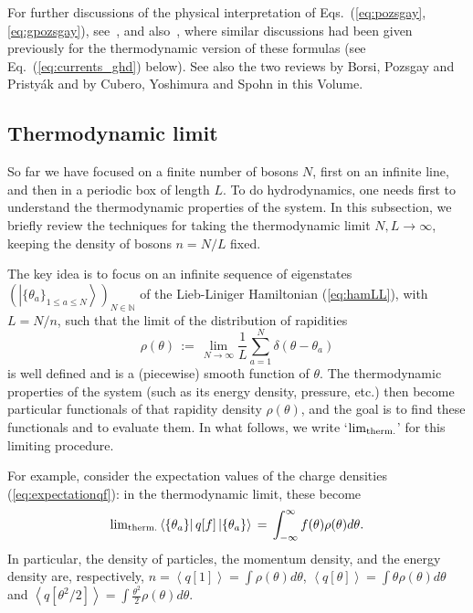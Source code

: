 \documentclass[onecolumn,amsfonts,showpacs,superscriptaddress]{revtex4-1}
\begin{document}
For further discussions of the physical interpretation of Eqs.~(\ref{eq:pozsgay},\ref{eq:gpozsgay}), see~\citep{borsi2020current}, and also~\citep{bonnes2014light,bertini2016transport,castro2016emergent,doyon2018soliton,doyon2019lecture}, where similar discussions had been given previously for the thermodynamic version of these formulas (see Eq.~(\ref{eq:currents_ghd}) below). See also the two reviews by Borsi, Pozsgay and Pristy\'ak and by Cubero, Yoshimura and Spohn in this Volume.




\subsection{Thermodynamic limit}
\label{subsec:thermodynamic_limit}

So far we have focused on a finite number of bosons $N$, first on an infinite line, and then in a periodic box of length $L$. To do hydrodynamics, one needs first to understand the thermodynamic properties of the system. In this subsection, we briefly review the techniques for taking the thermodynamic limit $N,L \rightarrow \infty$, keeping the density of bosons $n=N/L$ fixed.


The key idea is to focus on an infinite sequence of eigenstates $\left( \left| \{ \theta_a \}_{1 \leq a \leq N} \right> \right)_{N \in \mathbb{N}}$ of the Lieb-Liniger Hamiltonian (\ref{eq:hamLL}), with $L = N/n$, such that the limit of the distribution of rapidities
\begin{equation}
    \label{eq:rapidity_dist}
    \rho(\theta) \, := \, \lim_{N \rightarrow \infty} \frac{1}{L} \sum_{a=1}^N \delta (\theta-\theta_a)
\end{equation}
is well defined and is a (piecewise) smooth function of $\theta$. The thermodynamic properties of the system (such as its energy density, pressure, etc.) then become particular functionals of that rapidity density $\rho(\theta)$, and the goal is to find these functionals and to evaluate them. In what follows, we write `$\lim_{\rm therm.}$' for this limiting procedure.

For example, consider the expectation values of the charge densities (\ref{eq:expectationqf}): in the thermodynamic limit, these become
\begin{equation}
    {\rm lim}_{\rm therm.} \left< \{ \theta_a \} \right| q[f] \left|\{ \theta_a \} \right> \, = \, \int_{-\infty}^\infty f(\theta) \rho(\theta) d\theta .
\end{equation}
In particular, the density of particles, the momentum density, and the energy density are, respectively, $n= \left< q[1]\right> = \int \rho(\theta)d\theta$, $\left< q[\theta] \right> = \int \theta \rho(\theta)d\theta$ and $ \left< q[\theta^2/2] \right> = \int \frac{\theta^2}{2} \rho(\theta)d\theta$.
\end{document}
